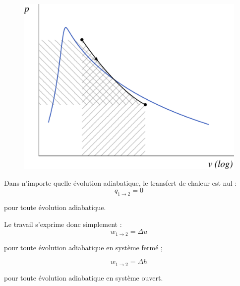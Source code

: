 		\begin{figure}
			\begin{center}
				\includegraphics[width=\pvdiagramwidth]{images/pv_lv_isentropique.png}
			\end{center}
			\label{fig_pv_lv_isentropique}
		\end{figure}

		
		Dans n’importe quelle évolution adiabatique, le transfert de chaleur est nul :
		\begin{equation}
			q_{1\to2} = 0
			\label{eq_lv_travail_adiabatique}
		\end{equation}
		\begin{equationterms}
			\item pour toute évolution adiabatique.
		\end{equationterms}

		Le travail s’exprime donc simplement :
		\begin{equation}
			w_{1\to2} = \Delta u
			\label{eq_lv_travail_adiabatique_sf}
		\end{equation}
		\begin{equationterms}
			\item pour toute évolution adiabatique en système fermé ;
		\end{equationterms}
		\begin{equation}
			w_{1\to2} = \Delta h
			\label{eq_lv_travail_adiabatique_so}
		\end{equation}
		\begin{equationterms}
			\item pour toute évolution adiabatique en système ouvert.
		\end{equationterms}


